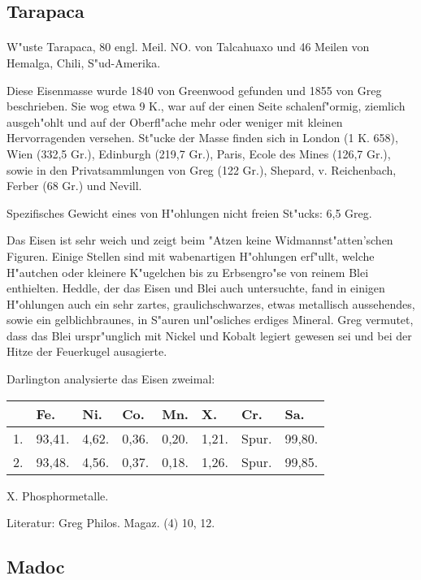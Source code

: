 \documentclass[a4paper, 11pt, oneside]{article}
\begin{document}
\subsection{Tarapaca}
\normalsize
\paragraph{}
W"uste Tarapaca, 80 engl. Meil. NO. von Talcahuaxo und 46 Meilen von Hemalga, Chili, S"ud-Amerika.

Diese Eisenmasse wurde 1840 von Greenwood gefunden und 1855 von Greg beschrieben. Sie wog etwa 9 K., war auf der einen Seite schalenf"ormig, ziemlich ausgeh"ohlt und auf der Oberfl"ache mehr oder weniger mit kleinen Hervorragenden versehen. St"ucke der Masse finden sich in London (1 K. 658), Wien (332,5 Gr.), Edinburgh (219,7 Gr.), Paris, Ecole des Mines (126,7 Gr.), sowie in den Privatsammlungen von Greg (122 Gr.), Shepard, v. Reichenbach, Ferber (68 Gr.) und Nevill.

Spezifisches Gewicht eines von H"ohlungen nicht freien St"ucks: 6,5 Greg.

Das Eisen ist sehr weich und zeigt beim "Atzen keine Widmannst"atten'schen Figuren. Einige Stellen sind mit wabenartigen H"ohlungen erf"ullt, welche H"autchen oder kleinere K"ugelchen bis zu Erbsengro"se von reinem Blei enthielten. Heddle, der das Eisen und Blei auch untersuchte, fand in einigen H"ohlungen auch ein sehr zartes, graulichschwarzes, etwas metallisch aussehendes, sowie ein gelblichbraunes, in S"auren unl"osliches erdiges Mineral. Greg vermutet, dass das Blei urspr"unglich mit Nickel und Kobalt legiert gewesen sei und bei der Hitze der Feuerkugel ausagierte.

Darlington analysierte das Eisen zweimal:
\begin{table}[H]
    \centering
    \begin{tabular}{l l l l l l l l}
    \hline
         & Fe. & Ni. & Co. & Mn. & X. & Cr. & Sa. \\ \hline
        1. & 93,41. & 4,62. & 0,36. & 0,20. & 1,21. & Spur. & 99,80. \\
        2. & 93,48. & 4,56. & 0,37. & 0,18. & 1,26. & Spur. & 99,85. \\
    \end{tabular}
\end{table}

X. Phosphormetalle.

\footnotesize
Literatur: Greg Philos. Magaz. (4) 10, 12.

\subsection{Madoc}
\normalsize
\end{document}

